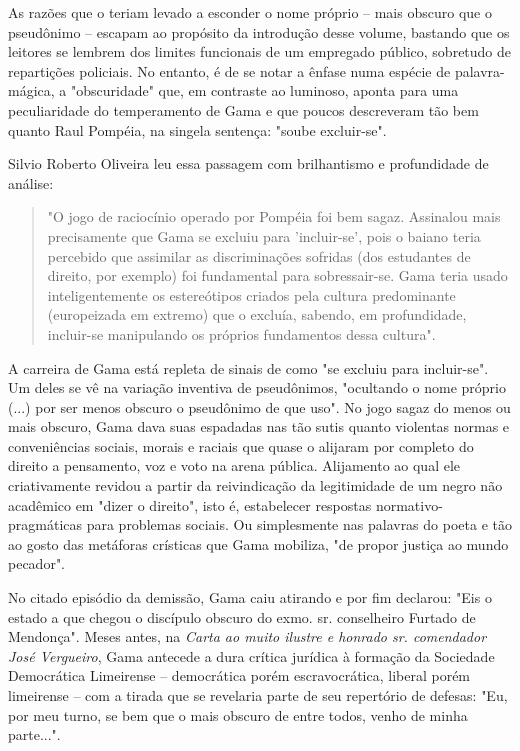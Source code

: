 As razões que o teriam levado a esconder o nome próprio -- mais obscuro
que o pseudônimo -- escapam ao propósito da introdução desse volume,
bastando que os leitores se lembrem dos limites funcionais de um
empregado público, sobretudo de repartições policiais. No entanto, é de
se notar a ênfase numa espécie de palavra-mágica, a "obscuridade" que,
em contraste ao luminoso, aponta para uma peculiaridade do temperamento
de Gama e que poucos descreveram tão bem quanto Raul Pompéia, na singela
sentença: "soube excluir-se".

Silvio Roberto Oliveira leu essa passagem com brilhantismo e
profundidade de análise:

\begin{quote}
"O jogo de raciocínio operado por Pompéia foi bem sagaz. Assinalou mais
precisamente que Gama se excluiu para 'incluir-se', pois o baiano teria
percebido que assimilar as discriminações sofridas (dos estudantes de
direito, por exemplo) foi fundamental para sobressair-se. Gama teria
usado inteligentemente os estereótipos criados pela cultura predominante
(europeizada em extremo) que o excluía, sabendo, em profundidade,
incluir-se manipulando os próprios fundamentos dessa cultura".
\end{quote}

A carreira de Gama está repleta de sinais de como "se excluiu para
incluir-se". Um deles se vê na variação inventiva de pseudônimos,
"ocultando o nome próprio (...) por ser menos obscuro o pseudônimo de
que uso". No jogo sagaz do menos ou mais obscuro, Gama dava suas
espadadas nas tão sutis quanto violentas normas e conveniências sociais,
morais e raciais que quase o alijaram por completo do direito a
pensamento, voz e voto na arena pública. Alijamento ao qual ele
criativamente revidou a partir da reivindicação da legitimidade de um
negro não acadêmico em "dizer o direito", isto é, estabelecer respostas
normativo-pragmáticas para problemas sociais. Ou simplesmente nas
palavras do poeta e tão ao gosto das metáforas crísticas que Gama
mobiliza, "de propor justiça ao mundo pecador".

No citado episódio da demissão, Gama caiu atirando e por fim declarou:
"Eis o estado a que chegou o discípulo obscuro do exmo. sr. conselheiro
Furtado de Mendonça". Meses antes, na \emph{Carta ao muito ilustre e
honrado sr. comendador José Vergueiro}, Gama antecede a dura crítica
jurídica à formação da Sociedade Democrática Limeirense -- democrática
porém escravocrática, liberal porém limeirense -- com a tirada que se
revelaria parte de seu repertório de defesas: "Eu, por meu turno, se bem
que o mais obscuro de entre todos, venho de minha parte...".

